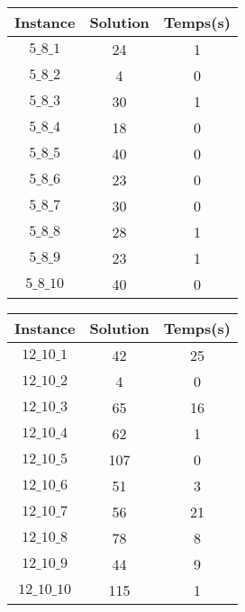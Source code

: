 \documentclass[a4paper, 11pt]{article} %
\begin{document}
\begin{center}
\begin{figure}[H]
   \begin{minipage}[c]{.46\linewidth}
      \begin{tabular}{|c|c|c|}
  		\hline 
  		  Instance & Solution & Temps(s) \\ \hline
        $5\_8\_1$   & 24 &  1 \\ \hline
        $5\_8\_2$   & 4 & 0 \\ \hline
        $5\_8\_3$   & 30 &  1 \\ \hline
        $5\_8\_4$   & 18 &  0 \\ \hline
        $5\_8\_5$   & 40 &  0 \\ \hline
        $5\_8\_6$   & 23 &  0 \\ \hline
        $5\_8\_7$   & 30 &  0 \\ \hline
        $5\_8\_8$   & 28 &  1 \\ \hline
        $5\_8\_9$   & 23 &  1 \\ \hline
        $5\_8\_10$  & 40 &  0 \\ \hline
  	  \end{tabular}
   \end{minipage} \hfill
   \begin{minipage}[c]{.46\linewidth}
      \begin{tabular}{|c|c|c|}
  		\hline 
  	    Instance & Solution & Temps(s) \\ \hline
        $12\_10\_1$   & 42 &  25 \\ \hline
        $12\_10\_2$   & 4 & 0 \\ \hline
        $12\_10\_3$   & 65 &  16 \\ \hline
        $12\_10\_4$   & 62 &  1 \\ \hline
        $12\_10\_5$   & 107 & 0 \\ \hline
        $12\_10\_6$   & 51 &  3 \\ \hline
        $12\_10\_7$   & 56 &  21 \\ \hline
        $12\_10\_8$   & 78 &  8 \\ \hline
        $12\_10\_9$   & 44 &  9 \\ \hline
        $12\_10\_10$  & 115 & 1 \\ \hline
  	  \end{tabular}
   \end{minipage}
\end{figure}


\end{center}
\end{document}
